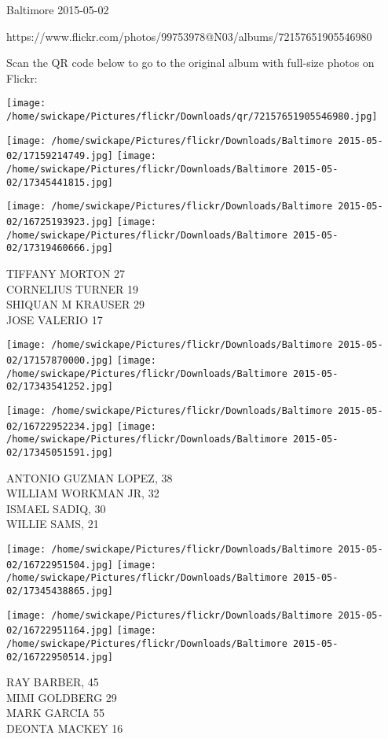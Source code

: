 \documentclass[10pt,letterpaper]{article}
\begin{document}
Baltimore 2015-05-02

https://www.flickr.com/photos/99753978@N03/albums/72157651905546980

Scan the QR code below to go to the original album with full-size photos on Flickr:

\texttt{[image: /home/swickape/Pictures/flickr/Downloads/qr/72157651905546980.jpg]}
\pagebreak

\texttt{[image: /home/swickape/Pictures/flickr/Downloads/Baltimore 2015-05-02/17159214749.jpg]}
\texttt{[image: /home/swickape/Pictures/flickr/Downloads/Baltimore 2015-05-02/17345441815.jpg]}

\texttt{[image: /home/swickape/Pictures/flickr/Downloads/Baltimore 2015-05-02/16725193923.jpg]}
\texttt{[image: /home/swickape/Pictures/flickr/Downloads/Baltimore 2015-05-02/17319460666.jpg]}

TIFFANY MORTON 27\\
CORNELIUS TURNER 19\\
SHIQUAN M KRAUSER 29\\
JOSE VALERIO 17
\pagebreak

\texttt{[image: /home/swickape/Pictures/flickr/Downloads/Baltimore 2015-05-02/17157870000.jpg]}
\texttt{[image: /home/swickape/Pictures/flickr/Downloads/Baltimore 2015-05-02/17343541252.jpg]}

\texttt{[image: /home/swickape/Pictures/flickr/Downloads/Baltimore 2015-05-02/16722952234.jpg]}
\texttt{[image: /home/swickape/Pictures/flickr/Downloads/Baltimore 2015-05-02/17345051591.jpg]}

ANTONIO GUZMAN LOPEZ, 38\\
WILLIAM WORKMAN JR, 32\\
ISMAEL SADIQ, 30\\
WILLIE SAMS, 21
\pagebreak

\texttt{[image: /home/swickape/Pictures/flickr/Downloads/Baltimore 2015-05-02/16722951504.jpg]}
\texttt{[image: /home/swickape/Pictures/flickr/Downloads/Baltimore 2015-05-02/17345438865.jpg]}

\texttt{[image: /home/swickape/Pictures/flickr/Downloads/Baltimore 2015-05-02/16722951164.jpg]}
\texttt{[image: /home/swickape/Pictures/flickr/Downloads/Baltimore 2015-05-02/16722950514.jpg]}

RAY BARBER, 45\\
MIMI GOLDBERG 29\\
MARK GARCIA 55\\
DEONTA MACKEY 16
\pagebreak
\end{document}
